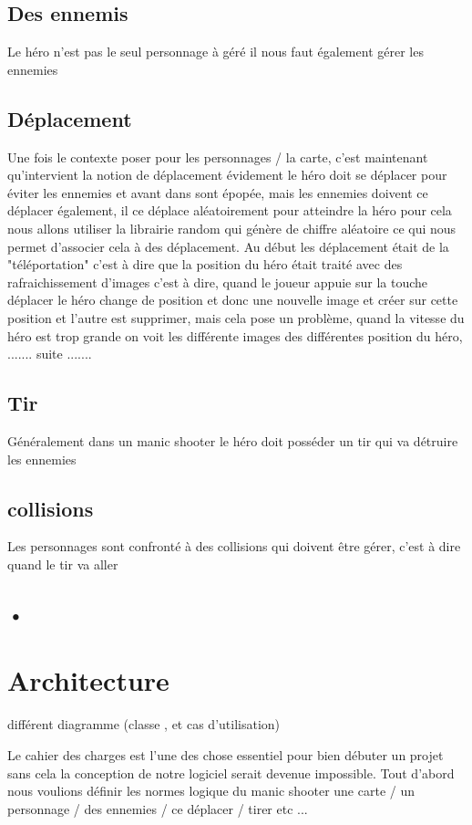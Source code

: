 \documentclass[a4paper, 11pt]{article}
\begin{document}
	\subsection{Des ennemis}
Le héro n'est pas le seul personnage à géré il nous faut également gérer les ennemies
	\subsection{Déplacement}
Une fois le contexte poser pour les personnages / la carte, c'est maintenant qu'intervient la notion de déplacement évidement le héro doit se déplacer pour éviter les ennemies et avant dans sont épopée, mais les ennemies doivent ce déplacer également, il ce déplace aléatoirement pour atteindre la héro pour cela nous allons utiliser la librairie random qui génère de chiffre aléatoire ce qui nous permet d'associer cela à des déplacement.
Au début les déplacement était de la "téléportation" c'est à dire que la position du héro était traité avec des rafraichissement d'images c'est à dire, quand le joueur appuie sur la touche déplacer le héro change de position et donc une nouvelle image et créer sur cette position et l'autre est supprimer, mais cela pose un problème, quand la vitesse du héro est trop grande on voit les différente images des différentes position du héro, ....... suite .......
	
	\subsection{Tir}
Généralement dans un manic shooter le héro doit posséder un tir qui va détruire les ennemies 
	\subsection{collisions}
Les personnages sont confronté à des collisions qui doivent être gérer, c'est à dire quand le tir va aller

 

\subsection{•}

\section{Architecture}

différent diagramme (classe , et cas d'utilisation)

Le cahier des charges est l'une des chose essentiel pour bien débuter un projet sans cela la conception de notre logiciel serait devenue impossible.
Tout d'abord nous voulions définir les normes logique du manic shooter 
une carte / un personnage / des ennemies / ce déplacer / tirer etc ... 
\end{document}
